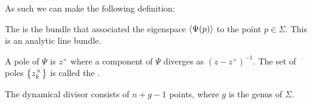 \documentclass{article}
\begin{document}
As such we can make the following definition:

\begin{definition}
	The  is the bundle that associated the eigenspace $\left\langle \Psi(p) \right\rangle$ to the point $p \in \Sigma$. This is an analytic line bundle.  
\end{definition}

\begin{definition}
A pole of $\Psi$ is $z^\times$ where a component of $\Psi$ diverges as $(z-z^\times)^{-1}$. The set of poles $\left\{ z_k^\times \right\}$ is called the . 
\end{definition}

\begin{prop}
The dynamical divisor consists of $n+g-1$ points, where $g$ is the genus of $\Sigma$. 
\end{prop}

\end{document}
